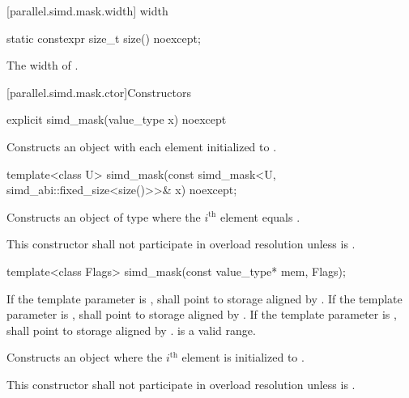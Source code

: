 [parallel.simd.mask.width]{ width}

\begin{itemdecl}
static constexpr size_t size() noexcept;
\end{itemdecl}

\begin{itemdescr}
  \pnum\returns
  The width of .
\end{itemdescr}

[parallel.simd.mask.ctor]{Constructors}

\begin{itemdecl}
explicit simd_mask(value_type x) noexcept
\end{itemdecl}

\begin{itemdescr}
  \pnum\effects
  Constructs an object with each element initialized to .
\end{itemdescr}

\begin{itemdecl}
template<class U> simd_mask(const simd_mask<U, simd_abi::fixed_size<size()>>& x) noexcept;
\end{itemdecl}

\begin{itemdescr}
  \pnum\effects
  Constructs an object of type  where the $i^\text{th}$ element equals  \foralli.

  \pnum\remarks
  This constructor shall not participate in overload resolution unless  is .
\end{itemdescr}

\begin{itemdecl}
template<class Flags> simd_mask(const value_type* mem, Flags);
\end{itemdecl}

\begin{itemdescr}
  \pnum\requires
  If the template parameter  is ,  shall point to storage aligned by . If the template parameter  is ,  shall point to storage aligned by . If the template parameter  is ,  shall point to storage aligned by . \tcode{[mem, mem + size())} is a valid range.

  \pnum\effects
  Constructs an object where the $i^\text{th}$ element is initialized to  \foralli.

  \pnum\remarks
  This constructor shall not participate in overload resolution unless  is .

\end{itemdescr}

